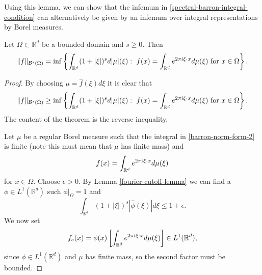 Using this lemma, we can show that the infemum in \eqref{spectral-barron-integral-condition} can alternatively be given by an infemum over integral representations by Borel measures.
\begin{lemma}
 Let $\Omega\subset \mathbb{R}^d$ be a bounded domain and $s \geq 0$. Then
 \begin{equation}\label{barron-norm-form-2}
  \|f\|_{\mathcal{B}^s(\Omega)} = \inf\left\{\int_{\mathbb{R}^d} (1+|\xi|)^sd|\mu|(\xi):~f(x)=\int_{\mathbb{R}^d} e^{2\pi {\mathrm{i}\mkern1mu}   \xi\cdot x}d\mu(\xi)~\text{for}~x\in\Omega\right\}.
 \end{equation}

\end{lemma}
\begin{proof}
 By choosing $\mu = \hat{f}(\xi)d\xi$ it is clear that
 \begin{equation}
  \|f\|_{\mathcal{B}^s(\Omega)} \geq \inf\left\{\int_{\mathbb{R}^d} (1+|\xi|)^sd|\mu|(\xi):~f(x)=\int_{\mathbb{R}^d} e^{2\pi {\mathrm{i}\mkern1mu}   \xi\cdot x}d\mu(\xi)~\text{for}~x\in\Omega\right\}.
 \end{equation}
 The content of the theorem is the reverse inequality.

 Let $\mu$ be a regular Borel measure such that the integral in \eqref{barron-norm-form-2} is finite (note this must mean that $\mu$ has finite mass) and 
 \begin{equation}
  f(x)=\int_{\mathbb{R}^d} e^{2\pi {\mathrm{i}\mkern1mu} \xi\cdot x}d\mu(\xi)
 \end{equation}
 for $x\in \Omega$. Choose $\epsilon > 0$. By Lemma \ref{fourier-cutoff-lemma} we can find a $\phi\in L^1(\mathbb{R}^d)$ such $\phi|_\Omega = 1$ and $$\int_{\mathbb{R}^d}(1+|\xi|)^s|\hat{\phi}(\xi)|d\xi \leq 1 + \epsilon.$$ 
 We now set
 \begin{equation}
  f_e(x) = \phi(x)\left[\int_{\mathbb{R}^d} e^{2\pi {\mathrm{i}\mkern1mu} \xi\cdot x}d\mu(\xi)\right]\in L^1(\mathbb{R}^d),
 \end{equation}
 since $\phi\in L^1(\mathbb{R}^d)$ and $\mu$ has finite mass, so the second factor must be bounded.


\end{proof}
